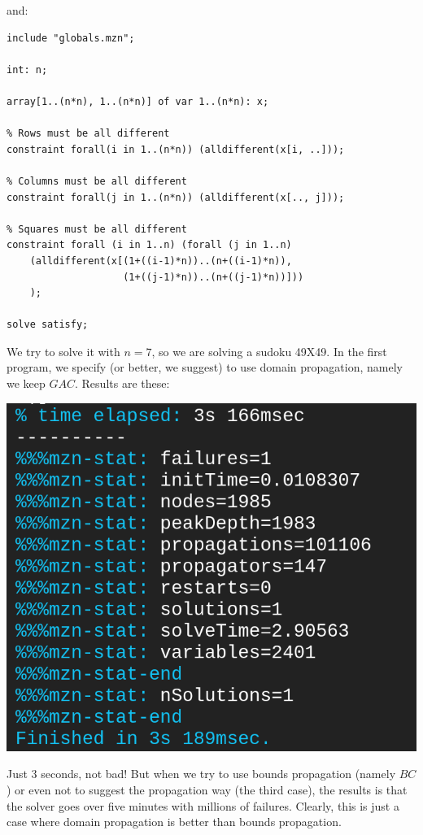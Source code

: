 \documentclass[10pt,a4paper]{article}
\begin{document}
and:

\begin{lstlisting}[style=none]
include "globals.mzn";

int: n;

array[1..(n*n), 1..(n*n)] of var 1..(n*n): x;

% Rows must be all different
constraint forall(i in 1..(n*n)) (alldifferent(x[i, ..]));

% Columns must be all different
constraint forall(j in 1..(n*n)) (alldifferent(x[.., j]));

% Squares must be all different
constraint forall (i in 1..n) (forall (j in 1..n)
	(alldifferent(x[(1+((i-1)*n))..(n+((i-1)*n)),
                    (1+((j-1)*n))..(n+((j-1)*n))]))
	);

solve satisfy;
\end{lstlisting}

We try to solve it with $n = 7$, so we are solving a sudoku 49X49. In the
first program, we specify (or better, we suggest) to use domain propagation,
namely we keep $GAC$. Results are these:

\includegraphics[scale=0.2]{sudoku_res.png}

Just 3 seconds, not bad! But when we try to use bounds propagation (namely $BC$)
or even not to suggest the propagation way (the third case), the results is that
the solver goes over five minutes with millions of failures. Clearly, this is
just a case where domain propagation is better than bounds propagation.
\end{document}
